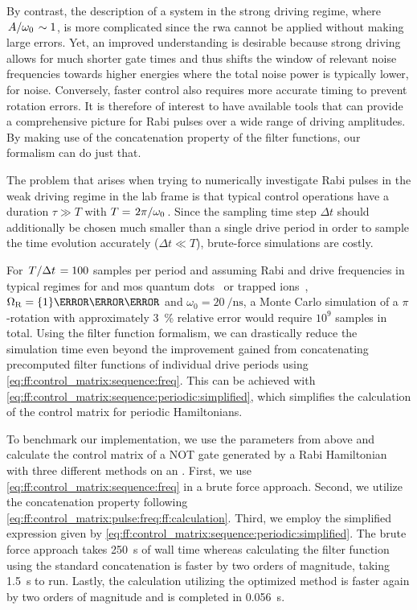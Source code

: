 By contrast, the description of a system in the strong driving regime, where $\flatfrac{A}{\omega_0}\sim 1$, is more complicated since the \gls{rwa} cannot be applied without making large errors.
Yet, an improved understanding is desirable because strong driving allows for much shorter gate times and thus shifts the window of relevant noise frequencies towards higher energies where the total noise power is typically lower, \eg for \oneoverf noise.
Conversely, faster control also requires more accurate timing to prevent rotation errors.
It is therefore of interest to have available tools that can provide a comprehensive picture for Rabi pulses over a wide range of driving amplitudes.
By making use of the concatenation property of the filter functions, our formalism can do just that.

The problem that arises when trying to numerically investigate Rabi pulses in the weak driving regime in the lab frame is that typical control operations have a duration $\tau\gg T$ with $T = \flatfrac{2\pi}{\omega_0}$.
Since the sampling time step $\Delta t$ should additionally be chosen much smaller than a single drive period in order to sample the time evolution accurately ($\Delta t\ll T$), brute-force simulations are costly.

For $\flatfrac{T}{\Delta t} = 100$ samples per period and assuming Rabi and drive frequencies in typical regimes for  and \gls{mos} quantum dots~\cite{Zajac2018,Pla2012} or trapped ions~\cite{Soare2014}, $\Omega_\mr{R} = \qty{1}{\per\micro\second}$ and $\omega_0 = \qty{20}{\per\nano\second}$, a Monte Carlo simulation of a $\pi$-rotation with approximately \qty{3}{\percent} relative error would require $10^9$ samples in total.
Using the filter function formalism, we can drastically reduce the simulation time even beyond the improvement gained from concatenating precomputed filter functions of individual drive periods using \cref{eq:ff:control_matrix:sequence:freq}.
This can be achieved with \cref{eq:ff:control_matrix:sequence:periodic:simplified}, which simplifies the calculation of the control matrix for periodic Hamiltonians.

To benchmark our implementation, we use the parameters from above and calculate the control matrix of a NOT gate generated by a Rabi Hamiltonian with three different methods on an \fastprocessor.
First, we use \cref{eq:ff:control_matrix:sequence:freq} in a brute force approach.
Second, we utilize the concatenation property following \cref{eq:ff:control_matrix:pulse:freq:ff:calculation}.
Third, we employ the simplified expression given by \cref{eq:ff:control_matrix:sequence:periodic:simplified}.
The brute force approach takes \qty{250}{\second} of wall time whereas calculating the filter function using the standard concatenation is faster by two orders of magnitude, taking \qty{1.5}{\second} to run.
Lastly, the calculation utilizing the optimized method is faster again by two orders of magnitude and is completed in \qty{0.056}{\second}.

